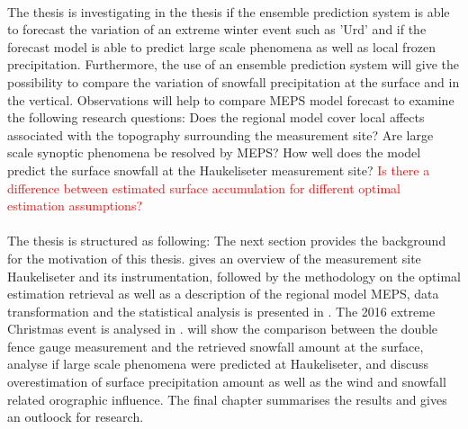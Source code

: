 \\
The thesis is investigating in the thesis if the ensemble prediction system is able to forecast the variation of an extreme winter event such as 'Urd' and if the forecast model is able to predict large scale phenomena as well as local frozen precipitation. Furthermore, the use of an ensemble prediction system will give the possibility to compare the variation of snowfall precipitation at the surface and in the vertical. Observations will help to compare MEPS model forecast to examine the following research questions: 
Does the regional model cover local affects associated with the topography surrounding the measurement site?
Are large scale synoptic phenomena be resolved by MEPS?
How well does the model predict the surface snowfall at the Haukeliseter measurement site? \textcolor{red}{Is there a difference between estimated surface accumulation for different optimal estimation assumptions? }
\\
\\
The thesis is structured as following: The next section provides the background for the motivation of this thesis.
 gives an overview of the measurement site Haukeliseter and its instrumentation, followed by the methodology on the optimal estimation retrieval as well as a description of the regional model MEPS, data transformation and the statistical analysis is presented in .
The 2016 extreme Christmas event is analysed in .  will show the comparison between the double fence gauge measurement and the retrieved snowfall amount at the surface, analyse if large scale phenomena were predicted at Haukeliseter, and discuss overestimation of surface precipitation amount as well as the wind and snowfall related orographic influence.
The final chapter summarises the results and gives an outloock for research.


